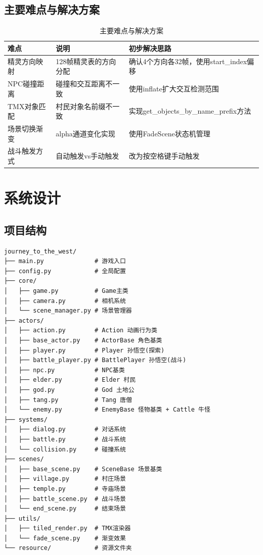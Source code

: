 \documentclass[12pt,a4paper]{article}
\begin{document}
\subsection{主要难点与解决方案}

\begin{table}[H]
\centering
\caption{主要难点与解决方案}
\renewcommand{\arraystretch}{1.3}
\begin{tabularx}{\textwidth}{>{\centering\arraybackslash}m{3cm}>{\centering\arraybackslash}m{4cm}>{\centering\arraybackslash}m{5cm}}
\toprule
\textbf{难点} & \textbf{说明} & \textbf{初步解决思路} \\
\midrule
精灵方向映射 & 128帧精灵表的方向分配 & 确认4个方向各32帧，使用start\_index偏移 \\
NPC碰撞距离 & 碰撞和交互距离不一致 & 使用inflate扩大交互检测范围 \\
TMX对象匹配 & 村民对象名前缀不一致 & 实现get\_objects\_by\_name\_prefix方法 \\
场景切换渐变 & alpha通道变化实现 & 使用FadeScene状态机管理 \\
战斗触发方式 & 自动触发vs手动触发 & 改为按空格键手动触发 \\
\bottomrule
\end{tabularx}
\end{table}

\section{系统设计}

\subsection{项目结构}

\begin{lstlisting}[language={},caption={项目目录结构}]
journey_to_the_west/
├── main.py              # 游戏入口
├── config.py            # 全局配置
├── core/
│   ├── game.py          # Game主类
│   ├── camera.py        # 相机系统
│   └── scene_manager.py # 场景管理器
├── actors/
│   ├── action.py        # Action 动画行为类
│   ├── base_actor.py    # ActorBase 角色基类
│   ├── player.py        # Player 孙悟空(探索)
│   ├── battle_player.py # BattlePlayer 孙悟空(战斗)
│   ├── npc.py           # NPC基类
│   ├── elder.py         # Elder 村民
│   ├── god.py           # God 土地公
│   ├── tang.py          # Tang 唐僧
│   └── enemy.py         # EnemyBase 怪物基类 + Cattle 牛怪
├── systems/
│   ├── dialog.py        # 对话系统
│   ├── battle.py        # 战斗系统
│   └── collision.py     # 碰撞系统
├── scenes/
│   ├── base_scene.py    # SceneBase 场景基类
│   ├── village.py       # 村庄场景
│   ├── temple.py        # 寺庙场景
│   ├── battle_scene.py  # 战斗场景
│   └── end_scene.py     # 结束场景
├── utils/
│   ├── tiled_render.py  # TMX渲染器
│   └── fade_scene.py    # 渐变效果
└── resource/            # 资源文件夹
\end{lstlisting}
\end{document}
